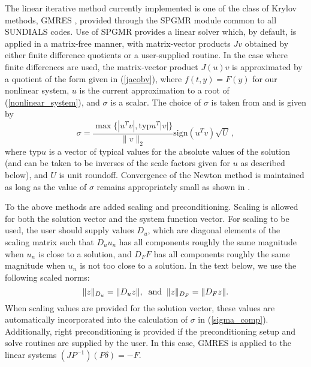 The linear iterative method currently implemented is one of the class of
Krylov methods, GMRES \cite{BrHi:89,SaSc:86},
provided through the SPGMR module common to all SUNDIALS codes.
Use of SPGMR provides a linear solver which, by default, is applied in a
matrix-free manner, with matrix-vector products $Jv$ obtained by either
finite difference quotients or a user-supplied routine.
In the case where finite differences are used,
the matrix-vector product $J(u)v$ is approximated by a quotient of the form
given in (\ref{jacobv}),
where $f(t, y) = F(y)$ for our nonlinear system,
$u$ is the current approximation to a root of (\ref{nonlinear_system}),
and $\sigma$ is a scalar.  The choice of $\sigma$ is taken from
\cite{BrSa:90} and is given by
\begin{equation}\label{sigma_comp}
  \sigma = \frac{\max \{|u^T v|, \mbox{typ}u^T |v|\}}{\|v\|_2}
  \mbox{sign}(u^T v) \sqrt{U} \, ,
\end{equation}
where $\mbox{typ}u$ is a vector of typical values for the absolute
values of the solution (and can be taken to be inverses of the scale
factors given for $u$ as described below), and $U$ is unit roundoff.
Convergence of the Newton method is maintained as long as the value of
$\sigma$ remains appropriately small as shown in \cite{Bro:87}.

To the above methods are added scaling and preconditioning.
Scaling is allowed for both the solution vector and the system
function vector. For scaling to be used, the user should supply
values $D_u$, which are diagonal elements of the scaling matrix
such that $D_u u_n$ has all components roughly the same magnitude
when $u_n$ is close to a solution, and $D_F F$ has all components
roughly the same magnitude when $u_n$ is not too close to a
solution. In the text below, we use the following scaled norms:
\begin{equation}
\|z\|_{D_u} = \|D_u z\|, \;\; {\rm and} \;\; \|z\|_{D_F} = \|D_F z\|.
\end{equation}
When scaling values are provided for the solution vector, these values are
automatically incorporated into the calculation of $\sigma$ in
(\ref{sigma_comp}).
Additionally, right preconditioning is provided if the preconditioning
setup and solve routines are supplied by the user.  In this case,
GMRES is applied to the linear systems $(JP^{-1})(P\delta) = -F$.

